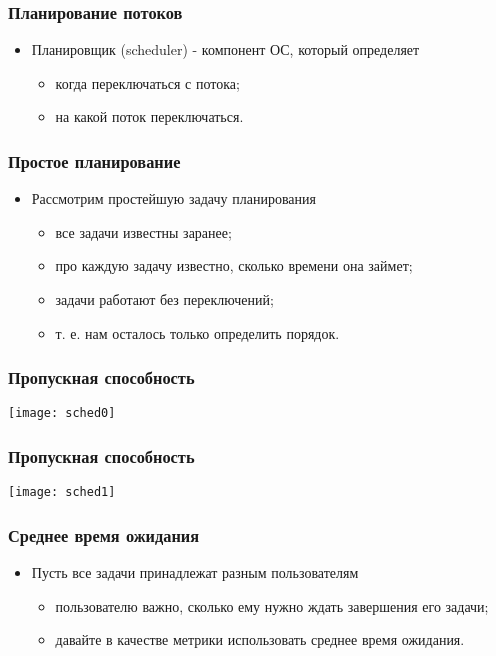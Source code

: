 \begin{frame}
\frametitle{Планирование потоков}
\begin{itemize}
    \item<1->Планировщик (scheduler) - компонент ОС, который определяет
    \begin{itemize}
        \item<2->когда переключаться с потока;
        \item<3->на какой поток переключаться.
    \end{itemize}
\end{itemize}
\end{frame}

\begin{frame}
\frametitle{Простое планирование}
\begin{itemize}
    \item<1->Рассмотрим простейшую задачу планирования
    \begin{itemize}
        \item<2->все задачи известны заранее;
        \item<3->про каждую задачу известно, сколько времени она займет;
        \item<4->задачи работают без переключений;
        \item<5->т. е. нам осталось только определить порядок.
    \end{itemize}
\end{itemize}
\end{frame}

\begin{frame}
\frametitle{Пропускная способность}
\texttt{[image: sched0]}
\end{frame}

\begin{frame}
\frametitle{Пропускная способность}
\texttt{[image: sched1]}
\end{frame}

\begin{frame}
\frametitle{Среднее время ожидания}
\begin{itemize}
    \item<1->Пусть все задачи принадлежат разным пользователям
    \begin{itemize}
        \item<2->пользователю важно, сколько ему нужно ждать
             завершения его задачи;
        \item<3->давайте в качестве метрики использовать среднее время ожидания.
    \end{itemize}
\end{itemize}
\end{frame}


